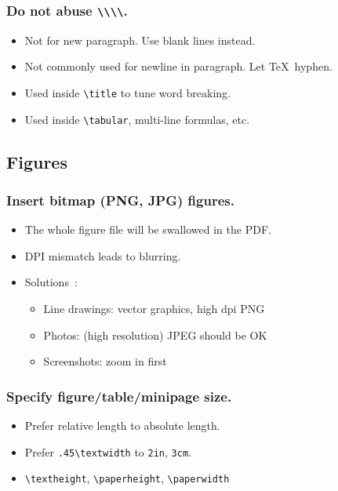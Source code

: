 \documentclass[CJKchecksingle]{beamer}
\begin{document}
\begin{frame}[fragile]\frametitle{Do not abuse \lstinline|\\\\|.}

\begin{itemize}
\item
  Not for new paragraph. Use blank lines instead.
\item
  Not commonly used for newline in paragraph. Let \TeX\ hyphen.
\pause
\item
  Used inside \lstinline{\title} to tune word breaking.
\item
  Used inside \lstinline{\tabular}, multi-line formulas, etc.
\end{itemize}

\end{frame}

\subsection{Figures}

\begin{frame}\frametitle{Insert bitmap (PNG, JPG) figures.}

\begin{itemize}
\item
  The whole figure file will be swallowed in the PDF.
\item
  DPI mismatch leads to blurring.
\pause
\item
  Solutions~\cite{hoeppner,blurry,blurry2}:
  \begin{itemize}
    \item
      Line drawings: \alert{vector graphics}, high dpi PNG
    \item
      Photos: (high resolution) JPEG should be OK
    \item
      Screenshots: zoom in first
  \end{itemize}
\end{itemize}

\end{frame}

\begin{frame}[fragile]\frametitle{Specify figure/table/minipage size.}

\begin{itemize}
\item
  Prefer relative length to absolute length.
\item
  Prefer \lstinline{.45\textwidth} to \lstinline{2in}, \lstinline{3cm}.
\item
  \lstinline{\textheight}, \lstinline{\paperheight}, \lstinline{\paperwidth}
\end{itemize}

\end{frame}
\end{document}
